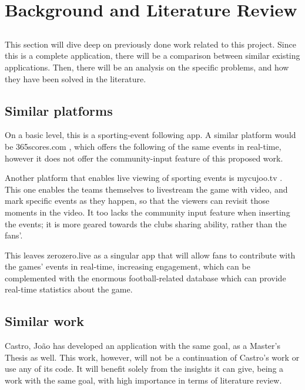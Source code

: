 \chapter{Background and Literature Review} \label{chap:sota}

\section*{}

This section will dive deep on previously done work related to this project. Since this is a complete application, there will be a comparison between similar existing applications. Then, there will be an analysis on the specific problems, and how they have been solved in the literature.

\section{Similar platforms}

On a basic level, this is a sporting-event following app. A similar platform would be 365scores.com \cite{365scores-about}, which offers the following of the same events in real-time, however it does not offer the community-input feature of this proposed work.

Another platform that enables live viewing of sporting events is mycujoo.tv \cite{mycujoo-about}. This one enables the teams themselves to livestream the game with video, and mark specific events as they happen, so that the viewers can revisit those moments in the video. It too lacks the community input feature when inserting the events; it is more geared towards the clubs sharing ability, rather than the fans'. 

This leaves zerozero.live as a singular app that will allow fans to contribute with the games' events in real-time, increasing engagement, which can be complemented with the enormous football-related database which can provide real-time statistics about the game.

\section{Similar work}

Castro, João \cite{PedroSousaCastro2020} has developed an application with the same goal, as a Master's Thesis as well. This work, however, will not be a continuation of Castro's work or use any of its code. It will benefit solely from the insights it can give, being a work with the same goal, with high importance in terms of literature review.

